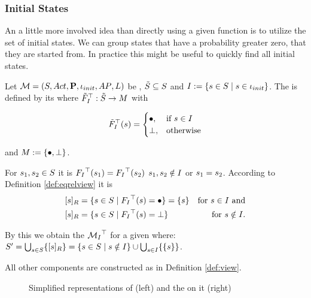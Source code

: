 \documentclass[preview]{standalone}
\begin{document}
\subsubsection{Initial States}
An a little more involved idea than directly using a given function is to utilize the set of initial states. We can group states that have a probability greater zero, that they are started from. In practice this might be useful to quickly find all initial states.

\begin{definition}
	Let ${{{\mathcal{M}}}} = {{({S}, {Act}, {\textbf{P}}, {\iota_{init}}, {AP}, {L})}}$ be \achgphN, ${\tilde{{S}}} \subseteq {S}$ and ${I} := \{{s} \in {S} \mid {s} \in {\ensuremath{{\iota_{init}}}}\}$. The \viewN \viewinitstates is defined by its \grpfctN \gfctinitstates where ${{\tilde{F}_{{{I}}}}^{\top}} : {\tilde{{S}}} \to {\ensuremath{{M}}}$ with 
	
	\[
	{{\tilde{F}_{{{I}}}}^{\top}}({s}) =
	\begin{cases}
			{\bullet},				& \text{if } {s} \in {I} \\
			{\bot},          	& \text{otherwise}
		\end{cases}
	\]
	
	and ${{M}} := {\{{\bullet}, {\bot}\}}$.
\end{definition}

For ${s}_1,{s}_2 \in {S}$ it is ${{F_{{{I}}}}^{\top}}({s}_1) = {{F_{{{I}}}}^{\top}}({s}_2)$ \iffN ${s}_1, {s}_2 \notin {I}$ or ${s}_1 = {s}_2$. According to Definition \ref{def:eqrelview} it is 
\begin{align*}
	\eqclassv &= \{\state \in \states \mid \gfctinitstates(\state) = \remelem\} = \{\state\} &\text{for } \state \in \initstates \text{ and} \\
	\eqclassv &= \{\state \in \states \mid \gfctinitstates(\state) = \notppty \}  &\text{for } \state \notin \initstates.
\end{align*}


By this we obtain the \viewN ${{{{{\mathcal{M}}}}_{{{I}}}}^{\top}}$ for a given \achgphN \chgph where: ${S}' = \bigcup_{{s} \in {S}} \{{{[{s}]_{{R}}}}\} = \{{s} \in {S} \mid {s} \notin {I}\}\cup \bigcup_{{s} \in {I}}\{\{{s}\}\}$.

All other components are constructed as in Definition \ref{def:view}.

\begin{figure}[h]
	\begin{minipage}{.5\textwidth}
		\hspace{5mm}
		
	\end{minipage}%
	\begin{minipage}{.5\textwidth}
		
	\end{minipage}
	\caption{Simplified representations of \mdp (left) and the \viewN \viewinitstates on it (right)}
	\label{fig:initStatesExmp}  
\end{figure}
\end{document}
